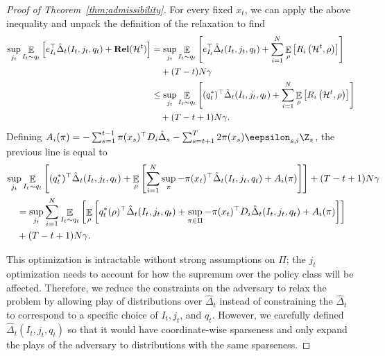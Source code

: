 \documentclass{article}
\newcommand{\exop}{\mathop{\ex}}
\newcommand{\rel}{\mathbf{Rel}}
\newcommand{\hist}{{\mathcal H}}
\begin{document}
\begin{proof}[Proof of Theorem~\ref{thm:admissibility}]
For every fixed $x_t$, we can apply the above inequality and unpack the definition of the relaxation to find
\begin{align*}
  \sup_{j_t} \mathop{\ex}_{I_t\sim q_t}\left[e_{I_t}^\top\hat\Delta_t(I_t,j_t,q_t)
  +  \rel(\hist^t) \right]
  &=
    \sup_{j_t } \mathop{\ex}_{I_t\sim q_t}\left[e_{I_t}^\top\hat\Delta_t(I_t,j_t,q_t)
    +  \sum_{i=1}^N \exop_\rho\left[R_i\left(\hist^{t},\rho\right)\right]\right]\\
  &\quad + (T-t)N\gamma\\
  &\leq
    \sup_{j_t} \mathop{\ex}_{I_t\sim q_t}\left[(q_t^*)^\top\hat\Delta_t(I_t,j_t,q_t)
    +
  \sum_{i=1}^N\exop_\rho\left[R_i\left(\hist^{t},\rho\right)\right]\right]\\
  &\quad+(T-t+1)N\gamma.
\end{align*}
Defining $A_i(\pi) = -\sum_{s=1}^{t-1} \pi(x_s)^\top D_i \hat \Delta_s - \sum_{s=t+1}^T 2\pi(x_s) \eepsilon_{s,i} \Z_{s}$, the previous line is equal to
\begin{align*}
\lefteqn{\sup_{j_t} \mathop{\ex}_{I_t\sim q_t}\left[(q_t^*)^\top\hat\Delta_t(I_t,j_t,q_t)
    +
  \mathop{\ex}_{\rho}\left[\sum_{i=1}^N \sup_{\pi} - \pi(x_t)^\top \hat\Delta_t(I_t,j_t,q_t) + A_i(\pi)
  \right]\right] + (T-t+1)N\gamma}\\
  &\quad =
    \sup_{j_t} \sum_{i=1}^N\mathop{\ex}_{I_t\sim q_t}\left[\mathop{\ex}_{\rho}\left[ q_t^*(\rho)^\top \hat \Delta_t (I_t,j_t,q_t)
    +
    \sup_{\pi\in\Pi} -\pi(x_t)^\top D_i\hat\Delta_t(I_t,j_t,q_t) + A_i(\pi)\right]\right]\\
  &\quad+ (T-t+1)N\gamma.
\end{align*}

This optimization is intractable without strong assumptions on $\Pi$; the $j_t$ optimization needs to account for how the supremum over the policy class will be affected. Therefore, we reduce the constraints on the adversary to relax the problem by allowing play of distributions over $\hat\Delta_t$ instead of constraining the $\hat\Delta_t$ to correspond to 
a specific choice of $I_t,j_t$, and $q_t$. However, we carefully defined $\hat\Delta_t(I_t,j_t,q_t)$ so that it would have coordinate-wise sparseness and only expand the plays of the adversary to distributions with the same sparseness.


\end{proof}
\end{document}
